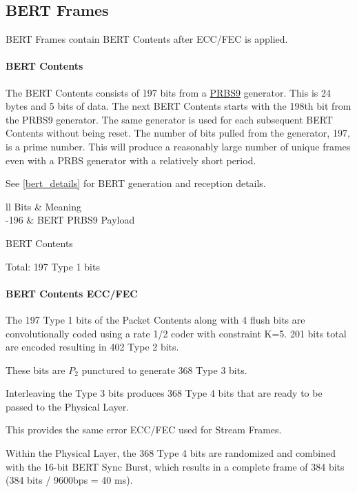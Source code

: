 \documentclass[a4paper,11pt,oneside]{book}
\begin{document}
\subsection{BERT Frames}

BERT Frames contain BERT Contents after ECC/FEC is applied.

\paragraph{BERT Contents}

The BERT Contents consists of 197 bits from a \href{https://en.wikipedia.org/wiki/Pseudorandom_binary_sequence}{PRBS9} generator. This is 24 bytes and 5 bits of data. The next BERT Contents starts with the 198th bit from the PRBS9 generator. The same generator is used for each subsequent BERT Contents without being reset. The number of bits pulled from the generator, 197, is a prime number. This will produce a reasonably large number of unique frames even with a PRBS generator with a relatively short period.

See \autoref{bert_details} for BERT generation and reception details.

\begin{table}[H]
	\centering
	\begin{tblr}{ll}
		\hline
		Bits & Meaning \\
		-196 & BERT PRBS9 Payload \\
		\hline[2px]
	\end{tblr}
	\caption{BERT Contents}
\end{table}

Total: 197 Type 1 bits

\paragraph{BERT Contents ECC/FEC}

The 197 Type 1 bits of the Packet Contents along with 4 flush bits are convolutionally coded using a rate 1/2 coder with constraint K=5. 201 bits total are encoded resulting in 402 Type 2 bits.

These bits are $P_2$ punctured to generate 368 Type 3 bits.

Interleaving the Type 3 bits produces 368 Type 4 bits that are ready to be passed to the Physical Layer.

This provides the same error ECC/FEC used for Stream Frames.

Within the Physical Layer, the 368 Type 4 bits are randomized and combined with the 16-bit BERT Sync Burst, which results in a complete frame of 384 bits (384 bits / 9600bps = 40 ms).
\end{document}

